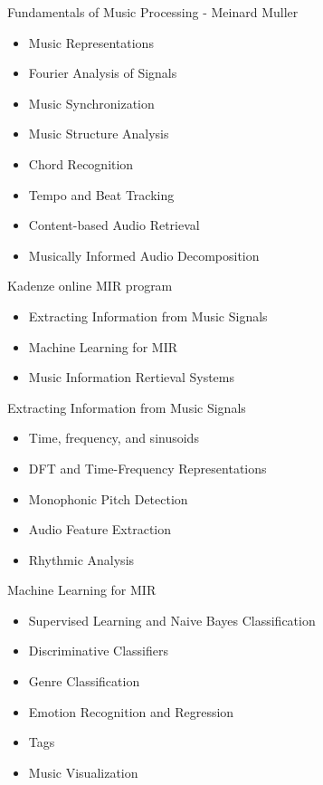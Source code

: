 \documentclass[12pt]{beamer}
\begin{document}
\begin{frame}{Fundamentals of Music Processing - Meinard Muller}
  \begin{itemize}
  \item{Music Representations}
  \item{Fourier Analysis of Signals}
  \item{Music Synchronization}
  \item{Music Structure Analysis}
  \item{Chord Recognition}
  \item{Tempo and Beat Tracking}
  \item{Content-based Audio Retrieval}
  \item{Musically Informed Audio Decomposition}
    \end{itemize}
  \end{frame} 


\begin{frame}{Kadenze online MIR program}

\begin{itemize}
\item{Extracting Information from Music Signals}
\item{Machine Learning for MIR}
\item{Music Information Rertieval Systems} 
\end{itemize} 

\end{frame}


\begin{frame}{Extracting Information from Music Signals}
  \begin{itemize}
  \item{Time, frequency, and sinusoids}
  \item{DFT and Time-Frequency Representations}
  \item{Monophonic Pitch Detection}
  \item{Audio Feature Extraction}
    \item{Rhythmic Analysis} 
    \end{itemize} 
\end{frame}


\begin{frame}{Machine Learning for MIR}

  \begin{itemize}
  \item{Supervised Learning and Naive Bayes Classification}
  \item{Discriminative Classifiers}
  \item{Genre Classification}
  \item{Emotion Recognition and Regression}
  \item{Tags}
  \item{Music Visualization} 
  \end{itemize} 

  \end{frame} 
\end{document}
